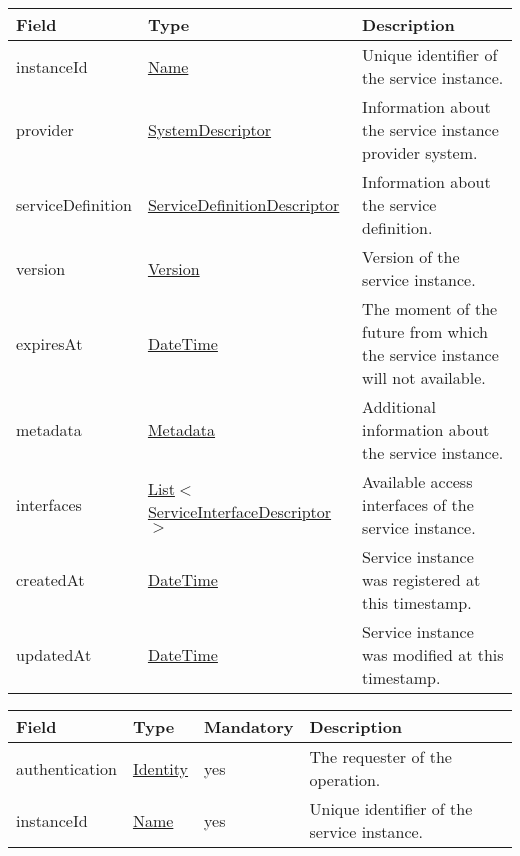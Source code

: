 \documentclass[a4paper]{arrowhead}
\newcommand{\pref}[1]{{\textcolor{ArrowheadGrey}{\hyperref[sec:model:primitives:#1]{#1}}}}
\begin{document}
\label{sec:model:ServiceLookupResult}
 
\begin{table}[ht!]
\begin{tabularx}{\textwidth}{| p{3cm} | p{5cm} | X |} \hline
\rowcolor{gray!33} Field & Type      & Description \\ \hline
instanceId & \pref{Name} & Unique identifier of the service instance. \\ \hline
provider & \hyperref[sec:model:SystemDescriptor]{SystemDescriptor} & Information about the service instance provider system. \\ \hline
serviceDefinition & \hyperref[sec:model:ServiceDefinitionDescriptor]{ServiceDefinitionDescriptor} & Information about the service definition. \\ \hline
version & \pref{Version} & Version of the service instance. \\ \hline
expiresAt & \pref{DateTime} & The moment of the future from which the service ins\-tance will not available. \\ \hline
metadata & \hyperref[sec:model:Metadata]{Metadata} & Additional information about the service ins\-tance. \\ \hline
interfaces & \pref{List}$<$\hyperref[sec:model:ServiceInterfaceDescriptor]{ServiceInterfaceDescriptor}$>$ & Available access interfaces of the service instance. \\ \hline
createdAt & \pref{DateTime} & Service instance was registered at this timestamp. \\ \hline
updatedAt & \pref{DateTime} & Service instance was modified at this timestamp. \\ \hline
\end{tabularx}
\end{table}

\clearpage

 \label{sec:model:ServiceRevokeRequest}
 
\begin{table}[ht!]
\begin{tabularx}{\textwidth}{| p{3cm} | p{3cm} | p{2cm} | X |} \hline
\rowcolor{gray!33} Field & Type & Mandatory & Description \\ \hline
authentication & \hyperref[sec:model:Identity]{Identity} & yes & The requester of the operation. \\ \hline
instanceId & \pref{Name} & yes & Unique identifier of the service instance. \\ \hline
\end{tabularx}
\end{table}
\end{document}
